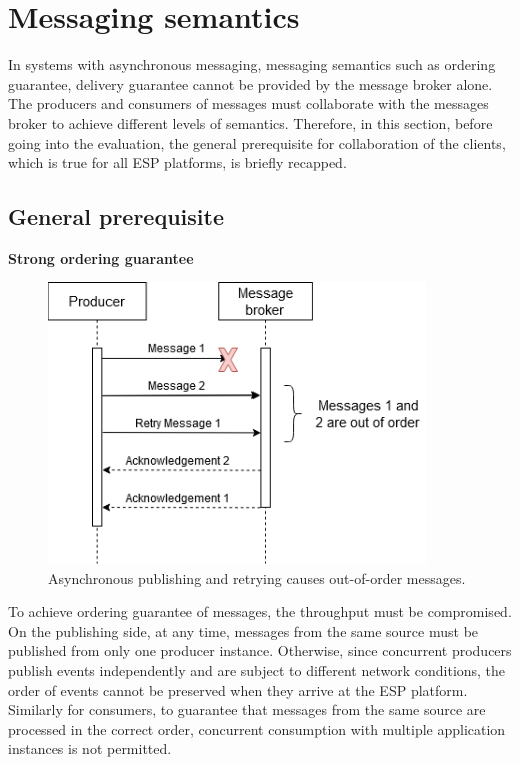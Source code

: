 \section{Messaging semantics} \label{section:semantics}
In systems with asynchronous messaging, messaging semantics such as ordering guarantee, delivery guarantee cannot be provided by the message broker alone. The producers and consumers of messages must collaborate with the messages broker to achieve different levels of semantics. Therefore, in this section, before going into the evaluation, the general prerequisite for collaboration of the clients, which is true for all ESP platforms, is briefly recapped.
\subsection{General prerequisite}
\textbf{Strong ordering guarantee}\\

\begin{figure}[h!]
	\centering
	\includegraphics[width=10cm]{images/order.png}
	\caption{Asynchronous publishing and retrying causes out-of-order messages.}
	\label{fig:outorderretry}
\end{figure}

To achieve ordering guarantee of messages, the throughput must be compromised. On the publishing side, at any time, messages from the same source must be published from only one producer instance. Otherwise, since concurrent producers publish events independently and are subject to different network conditions, the order of events cannot be preserved when they arrive at the ESP platform. Similarly for consumers, to guarantee that messages from the same source are processed in the correct order, concurrent consumption with multiple application instances is not permitted.

